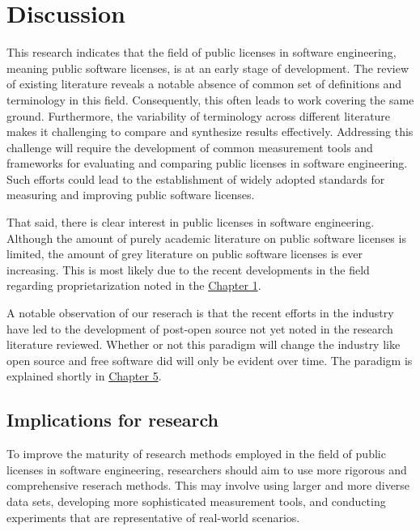 \chapter{Discussion\label{discussion}}
This research indicates that the field of public licenses in software engineering, meaning public software licenses, is at an early stage of development. The review of existing literature reveals a notable absence of common set of definitions and terminology in this field. Consequently, this often leads to work covering the same ground. Furthermore, the variability of terminology across different literature makes it challenging to compare and synthesize results effectively. Addressing this challenge will require the development of common measurement tools and frameworks for evaluating and comparing public licenses in software engineering. Such efforts could lead to the establishment of widely adopted standards for measuring and improving public software licenses.

That said, there is clear interest in public licenses in software engineering. Although the amount of purely academic literature on public software licenses is limited, the amount of grey literature on public software licenses is ever increasing. This is most likely due to the recent developments in the field regarding proprietarization noted in the \hyperref[intro]{Chapter 1}. 

A notable observation of our reserach is that the recent efforts in the industry have led to the development of post-open source not yet noted in the research literature reviewed. Whether or not this paradigm will change the industry like open source and free software did will only be evident over time. The paradigm is explained shortly in \hyperref[conclusions]{Chapter 5}.

\section{Implications for research}
To improve the maturity of research methods employed in the field of public licenses in software engineering, researchers should aim to use more rigorous and comprehensive reserach methods. This may involve using larger and more diverse data sets, developing more sophisticated measurement tools, and conducting experiments that are representative of real-world scenarios.


